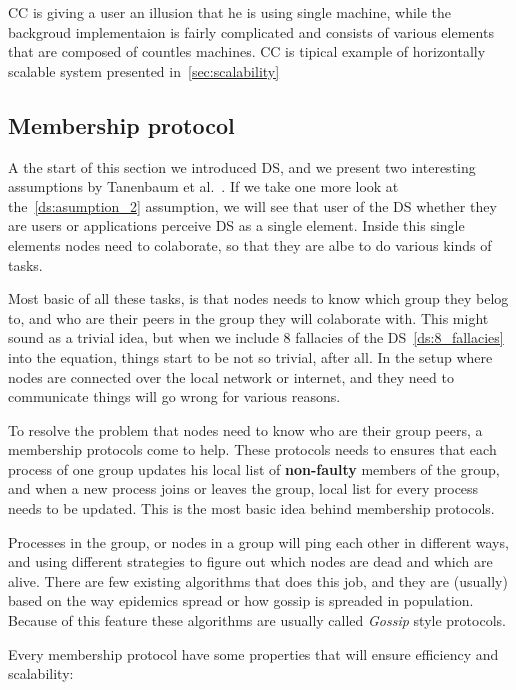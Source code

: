 CC is giving a user an illusion that he is using single machine, while the backgroud implementaion is fairly complicated and consists of various elements that are composed of countles machines. CC is tipical example of horizontally scalable system presented in~\ref{sec:scalability}
%
%
\subsection{Membership protocol}\label{sec:memership_protocol}
%
A the start of this section we introduced DS, and we present two interesting assumptions by Tanenbaum et al.~\cite{SteenT16, 0019513}. If we take one more look at the~\ref{ds:asumption_2} assumption, we will see that user of the DS whether they are users or applications perceive DS as a single element. Inside this single elements nodes need to colaborate, so that they are albe to do various kinds of tasks.

Most basic of all these tasks, is that nodes needs to know which group they belog to, and who are their peers in the group they will colaborate with. This might sound as a trivial idea, but when we include 8 fallacies of the DS~\ref{ds:8_fallacies} into the equation, things start to be not so trivial, after all. In the setup where nodes are connected over the local network or internet, and they need to communicate things will go wrong for various reasons.

To resolve the problem that nodes need to know who are their group peers, a membership protocols come to help. These protocols needs to ensures that each process of one group updates his local list of \textbf{non-faulty} members of the group, and when a new process joins or leaves the group, local list for every process needs to be updated. This is the most basic idea behind membership protocols.

Processes in the group, or nodes in a group will ping each other in different ways, and using different strategies to figure out which nodes are dead and which are alive. There are few existing algorithms that does this job, and they are (usually) based on the way epidemics spread or how gossip is spreaded in population. Because of this feature these algorithms are usually called \textit{Gossip} style protocols.

Every membership protocol have some properties that will ensure efficiency and scalability:

